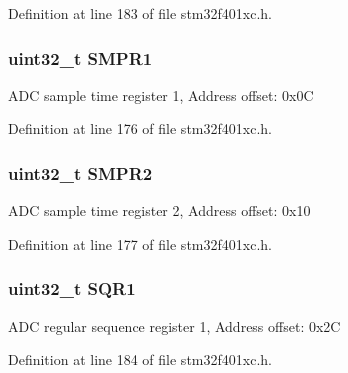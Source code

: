 Definition at line 183 of file stm32f401xc.\+h.

\subsubsection[{\texorpdfstring{S\+M\+P\+R1}{SMPR1}}]{ uint32\+\_\+t S\+M\+P\+R1}\hypertarget{struct_a_d_c___type_def_af9d6c604e365c7d9d7601bf4ef373498}{}\label{struct_a_d_c___type_def_af9d6c604e365c7d9d7601bf4ef373498}
A\+DC sample time register 1, Address offset\+: 0x0C 

Definition at line 176 of file stm32f401xc.\+h.

\subsubsection[{\texorpdfstring{S\+M\+P\+R2}{SMPR2}}]{ uint32\+\_\+t S\+M\+P\+R2}\hypertarget{struct_a_d_c___type_def_a6ac83fae8377c7b7fcae50fa4211b0e8}{}\label{struct_a_d_c___type_def_a6ac83fae8377c7b7fcae50fa4211b0e8}
A\+DC sample time register 2, Address offset\+: 0x10 

Definition at line 177 of file stm32f401xc.\+h.

\subsubsection[{\texorpdfstring{S\+Q\+R1}{SQR1}}]{ uint32\+\_\+t S\+Q\+R1}\hypertarget{struct_a_d_c___type_def_a3302e1bcfdfbbfeb58779d0761fb377c}{}\label{struct_a_d_c___type_def_a3302e1bcfdfbbfeb58779d0761fb377c}
A\+DC regular sequence register 1, Address offset\+: 0x2C 

Definition at line 184 of file stm32f401xc.\+h.

